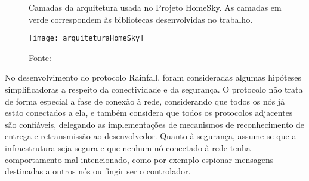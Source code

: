 \begin{figure}[H]
	\centering
	\caption{Camadas da arquitetura usada no Projeto HomeSky. As camadas em verde correspondem às bibliotecas desenvolvidas no trabalho.}
  \texttt{[image: arquiteturaHomeSky]}
	\caption*{Fonte: \cite{homeSky}}
\label{fig:arquiteturaHomeSky}
\end{figure}

No desenvolvimento do protocolo Rainfall, foram consideradas algumas hipóteses simplificadoras a respeito da conectividade e da segurança. O protocolo não trata de forma especial a fase de conexão à rede, considerando que todos os nós já estão conectados a ela, e também considera que todos os protocolos adjacentes são confiáveis, delegando as implementações de mecanismos de reconhecimento de entrega e retransmissão ao desenvolvedor. Quanto à segurança, assume-se que a infraestrutura seja segura e que nenhum nó conectado à rede tenha comportamento mal intencionado, como por exemplo espionar mensagens destinadas a outros nós ou fingir ser o controlador.
